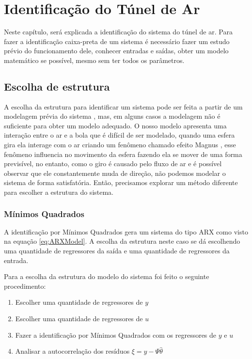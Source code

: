 \chapter{Identificação do Túnel de Ar} \label{cap4}

Neste capítulo, será explicada a identificação do sistema do túnel de ar. Para fazer a identificação caixa-preta de um sistema é necessário fazer um estudo prévio do funcionamento dele, conhecer entradas e saídas, obter um modelo matemático se possível, mesmo sem ter todos os parâmetros.
\section{Escolha de estrutura}
A escolha da estrutura para identificar um sistema pode ser feita a partir de um modelagem prévia do sistema  , mas, em alguns casos a modelagem não é suficiente para obter um modelo adequado. O nosso modelo apresenta uma interação entre o ar e a bola que é difícil de ser modelado, quando uma esfera gira ela interage com o ar criando um fenômeno chamado efeito Magnus \cite{briggs1959}, esse fenômeno influencia no movimento da esfera fazendo ela se mover de uma forma previsível, no entanto, como o giro é causado pelo fluxo de ar e é possível observar que ele constantemente muda de direção, não podemos modelar o sistema de forma satisfatória. Então, precisamos explorar um método diferente para escolher a estrutura do sistema.

\subsection{Mínimos Quadrados}\label{s:4mq}

A identificação por Mínimos Quadrados gera um sistema do tipo ARX como visto na equação \eqref{eq:ARXModel}. A escolha da estrutura neste caso se dá escolhendo uma quantidade de regressores da saída e uma quantidade de regressores da entrada. 


Para a escolha da estrutura do modelo do sistema foi feito o seguinte procedimento:
\begin{enumerate}
	\item Escolher uma quantidade de regressores de $y$
	\item Escolher uma quantidade de regressores de $u$
	\item Fazer a identificação por Mínimos Quadrados com os regressores de $y$ e $u$
	\item Analisar a autocorrelação dos resíduos $\xi=y-\Psi \hat{\theta}$
\end{enumerate}

